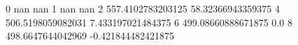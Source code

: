 0 nan nan
1 nan nan
2 557.4102783203125 58.32366943359375
4 506.5198059082031 7.433197021484375
6 499.08660888671875 0.0
8 498.6647644042969 -0.421844482421875
